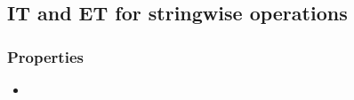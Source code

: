 \subsection{IT and ET for stringwise operations}
\label{otf:sun}

\subsubsection{Properties}
\begin{itemize}
 \item 
\end{itemize}
